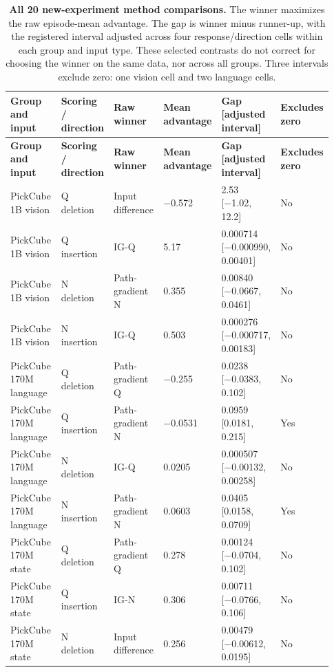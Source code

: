 \setlength{\tabcolsep}{2pt}
\begin{longtable}{p{0.210\linewidth} p{0.140\linewidth} p{0.180\linewidth} p{0.110\linewidth} p{0.210\linewidth} p{0.080\linewidth}}
\caption{\textbf{All 20 new-experiment method comparisons.} The winner maximizes the raw episode-mean advantage. The gap is winner minus runner-up, with the registered interval adjusted across four response/direction cells within each group and input type. These selected contrasts do not correct for choosing the winner on the same data, nor across all groups. Three intervals exclude zero: one vision cell and two language cells.}\label{tab:r1-all-methods}\\
\toprule
\textbf{Group and input} & \textbf{Scoring / direction} & \textbf{Raw winner} & \textbf{Mean advantage} & \textbf{Gap [adjusted interval]} & \textbf{Excludes zero} \\
\midrule\endfirsthead
\toprule
\textbf{Group and input} & \textbf{Scoring / direction} & \textbf{Raw winner} & \textbf{Mean advantage} & \textbf{Gap [adjusted interval]} & \textbf{Excludes zero} \\
\midrule\endhead
\bottomrule\endfoot
PickCube 1B vision & Q deletion & Input difference & −0.572 & 2.53 [−1.02, 12.2] & No \\
PickCube 1B vision & Q insertion & IG-Q & 5.17 & 0.000714 [−0.000990, 0.00401] & No \\
PickCube 1B vision & N deletion & Path-gradient N & 0.355 & 0.00840 [−0.0667, 0.0461] & No \\
PickCube 1B vision & N insertion & IG-Q & 0.503 & 0.000276 [−0.000717, 0.00183] & No \\
PickCube 170M language & Q deletion & Path-gradient Q & −0.255 & 0.0238 [−0.0383, 0.102] & No \\
PickCube 170M language & Q insertion & Path-gradient N & −0.0531 & 0.0959 [0.0181, 0.215] & Yes \\
PickCube 170M language & N deletion & IG-Q & 0.0205 & 0.000507 [−0.00132, 0.00258] & No \\
PickCube 170M language & N insertion & Path-gradient N & 0.0603 & 0.0405 [0.0158, 0.0709] & Yes \\
PickCube 170M state & Q deletion & Path-gradient Q & 0.278 & 0.00124 [−0.0704, 0.102] & No \\
PickCube 170M state & Q insertion & IG-N & 0.306 & 0.00711 [−0.0766, 0.106] & No \\
PickCube 170M state & N deletion & Input difference & 0.256 & 0.00479 [−0.00612, 0.0195] & No \\

\end{longtable}
